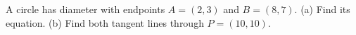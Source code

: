 A circle has diameter with endpoints $A=(2,3)$ and $B=(8,7)$. (a) Find its equation. (b) Find both tangent lines through $P=(10,10)$.
